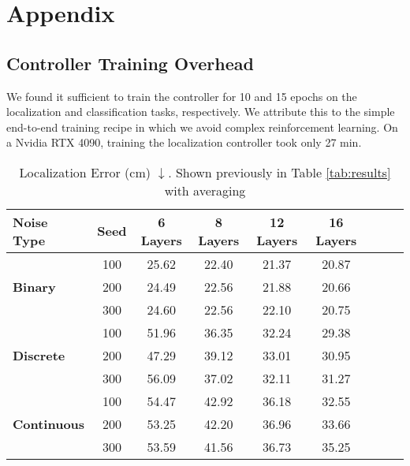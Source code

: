 \newpage
\appendix
\onecolumn
\section{Appendix}

\subsection{Controller Training Overhead}
\label{subsec:controller_overhead}
We found it sufficient to train the controller for 10 and 15 epochs on the localization and classification tasks, respectively. We attribute this to the simple end-to-end training recipe in which we avoid complex reinforcement learning. On a Nvidia RTX 4090, training the localization controller took only 27 min. 



\begin{table*}[h]
\centering
\begin{tabular}{lcccccccc}
\toprule
\textbf{Noise Type}       & \textbf{Seed} & \textbf{6 Layers} & \textbf{8 Layers} & \textbf{12 Layers} & \textbf{16 Layers} \\ 
\midrule
\multirow{3}{*}{\textbf{Binary}} 
                    & 100           & 25.62             & 22.40             & 21.37              & 20.87              \\
                    & 200           & 24.49             & 22.56             & 21.88              & 20.66              \\
                    & 300           & 24.60             & 22.56             & 22.10              & 20.75              \\ 
\midrule
\multirow{3}{*}{\textbf{Discrete}} 
                    & 100           & 51.96             & 36.35             & 32.24              & 29.38              \\
                    & 200           & 47.29             & 39.12             & 33.01              & 30.95              \\
                    & 300           & 56.09             & 37.02             & 32.11              & 31.27              \\ 
\midrule
\multirow{3}{*}{\textbf{Continuous}} 
                    & 100           & 54.47             & 42.92             & 36.18              & 32.55              \\
                    & 200           & 53.25             & 42.20             & 36.96              & 33.66              \\
                    & 300           & 53.59             & 41.56             & 36.73              & 35.25              \\ 
\bottomrule
\end{tabular}
\caption{\name Localization Error (cm) $\downarrow$. Shown previously in Table \ref{tab:results} with averaging}
\label{tab:admn_full_loc}
\end{table*}



